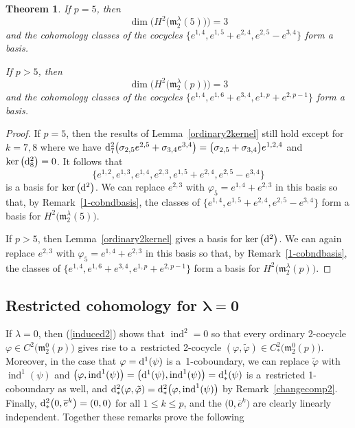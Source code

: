 \documentclass[10pt,a4paper]{amsart}
\def\ind{\operatorname{ind}}
\def\phi{\varphi}
\def\m{\mathfrak m}
\numberwithin{equation}{section}
\newtheorem{Theorem}{Theorem}[section]
\begin{document}
\begin{Theorem}\label{ordinary2}
 If $p=5$, then
 \[\dim\big(H^2\big(\m_2^\lambda(5)\big)\big)=3\] and the
 cohomology classes of the cocycles
 $\big\{e^{1,4}, e^{1,5}+e^{2,4}, e^{2,5}-e^{3,4}\big\}$ form a basis.

 If $p>5$, then
 \[\dim\big(H^2\big(\m_2^\lambda(p)\big)\big)=3\] and the
 cohomology classes of the cocycles $\big\{e^{1,4}, e^{1,6}+e^{3,4}, e^{1,p}+e^{2,p-1}\big\}$ form a basis.
\end{Theorem}

\begin{proof} If $p=5$, then the results of Lemma~\ref{ordinary2kernel} still hold except for $k=7,8$ where we
 have
 ${\rm d}^2_7\big(\sigma_{2,5}e^{2,5}+\sigma_{3,4}e^{3,4}\big)=\big(\sigma_{2,5}+\sigma_{3,4}\big)e^{1,2,4}$
 and $\ker\big({\rm d}^2_8\big)=0$. It follows that
 \[\big\{e^{1,2}, e^{1,3}, e^{1,4}, e^{2,3},
 e^{1,5}+e^{2,4},e^{2,5}-e^{3,4}\big\}\] is a basis for $\ker
 \big({\rm d}^2\big)$. We can replace $e^{2,3}$ with $\phi_5=e^{1,4}+e^{2,3}$ in
 this basis so that, by Remark~\ref{1-cobndbasis}, the classes of
 $\big\{e^{1,4}, e^{1,5}+e^{2,4}, e^{2,5}-e^{3,4}\big\}$ form a basis for
 $H^2\big(\m_2^\lambda(5)\big)$.

 If $p > 5$, then Lemma~\ref{ordinary2kernel} gives a basis for $\ker \big({\rm d}^2\big)$. We can again replace $e^{2,3}$ with $\phi_5=e^{1,4}+e^{2,3}$ in this basis so that, by Remark~\ref{1-cobndbasis}, the classes of $\big\{e^{1,4}, e^{1,6}+e^{3,4}, e^{1,p}+e^{2,p-1}\big\}$ form a basis for
 $H^2\big(\m_2^\lambda(p)\big)$.
\end{proof}

\subsection[Restricted cohomology for $\lambda=0$]{Restricted cohomology for $\boldsymbol{\lambda=0}$}\label{section4.2}
If $\lambda=0$, then (\ref{induced2}) shows that $\ind^2=0$ so that
every ordinary 2-cocycle $\phi\in C^2\big(\m_2^0(p)\big)$ gives rise to a~restricted 2-cocycle $(\phi,\tilde \phi)\in
C^2_*\big(\m_2^0(p)\big)$. Moreover, in the case that $\phi={\rm d}^1(\psi)$ is a~1-coboundary, we can replace $\tilde\phi$ with $\ind^1(\psi)$ and
$\big(\phi,\ind^1(\psi)\big)=\big({\rm d}^1(\psi),\ind^1(\psi)\big)={\rm d}^1_*(\psi)$ is a~restricted 1-coboundary as well, and
${\rm d}^2_*(\phi,\tilde\phi)={\rm d}^2_*\big(\phi,\ind^1(\psi)\big)$ by Remark~\ref{changecomp2}. Finally, ${\rm d}^2_*\big(0,\overline e^k\big)=(0,0)$ for
all $1\le k\le p$, and the $\big(0,\overline e^k\big)$ are clearly linearly independent. Together these remarks prove the following
\end{document}
